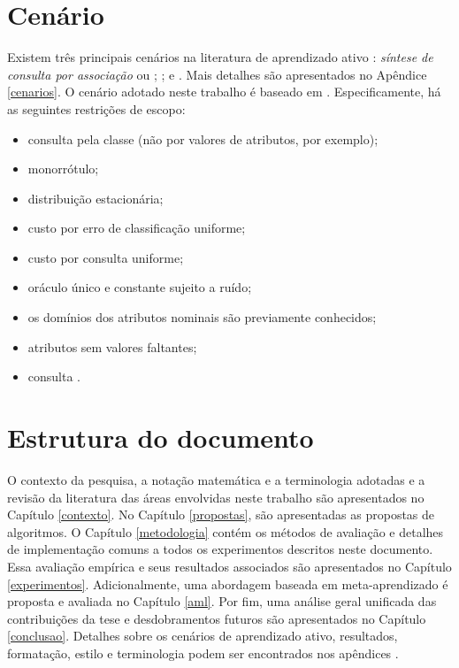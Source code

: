 \section{Cenário}\label{cenario}
Existem três principais cenários na literatura de aprendizado ativo
\citep{settles2010active}:
\textit{síntese de consulta por associação} ou
;
; e
.
Mais detalhes são apresentados no Apêndice \ref{cenarios}.
O cenário adotado neste trabalho é baseado em \pool.
Especificamente, há as seguintes restrições de escopo:
\begin{itemize}
 \item consulta pela classe (não por valores de atributos, por exemplo);
 \item monorrótulo;
 \item distribuição estacionária;
 \item custo por erro de classificação uniforme;
 \item custo por consulta uniforme;
 \item oráculo único e constante sujeito a ruído;
 \item os domínios dos atributos nominais são previamente conhecidos;
 \item atributos sem valores faltantes;
 \item consulta .
\end{itemize}

\section{Estrutura do documento}\label{estrutura}
O contexto da pesquisa, a notação matemática e a terminologia adotadas e a revisão da literatura das áreas
envolvidas neste trabalho são apresentados no Capítulo \ref{contexto}.
No Capítulo \ref{propostas},
são apresentadas as propostas de algoritmos.
O Capítulo \ref{metodologia} contém os métodos de avaliação e detalhes de
implementação comuns a todos os experimentos descritos neste documento.
Essa avaliação empírica e seus resultados associados são apresentados
no Capítulo \ref{experimentos}.
Adicionalmente, uma abordagem baseada em meta-aprendizado
é proposta e avaliada no Capítulo \ref{aml}.
Por fim, uma análise geral unificada das contribuições da tese e
desdobramentos futuros são apresentados no
Capítulo \ref{conclusao}.
Detalhes sobre os cenários de aprendizado ativo, resultados,
formatação, estilo e terminologia podem ser encontrados nos apêndices .

